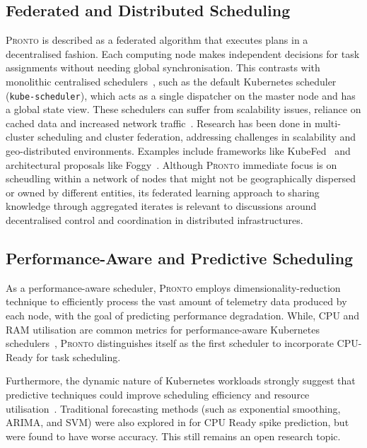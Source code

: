 \subsection{Federated and Distributed Scheduling}
\textsc{Pronto} is described as a federated algorithm that executes plans in a
decentralised fashion. Each computing node makes independent decisions for task
assignments without needing global synchronisation. This contrasts with
monolithic centralised schedulers~\cite{kube-scheduler, gog_firmament_2016},
such as the default Kubernetes scheduler (\texttt{kube-scheduler}), which acts
as a single dispatcher on the master node and has a global state view. These
schedulers can suffer from scalability issues, reliance on cached data and
increased network traffic~\cite{grammenos_pronto_2021}. Research has been done
in multi-cluster scheduling and cluster federation, addressing challenges in
scalability and geo-distributed environments. Examples include frameworks like
KubeFed~\cite{faticanti2021application} and architectural proposals like
Foggy~\cite{santoro2017foggy}. Although \textsc{Pronto} immediate focus is on
scheudling within a network of nodes that might not be geographically dispersed
or owned by different entities, its federated learning approach to sharing
knowledge through aggregated iterates is relevant to discussions around
decentralised control and coordination in distributed infrastructures.

\subsection{Performance-Aware and Predictive Scheduling}
As a performance-aware scheduler, \textsc{Pronto} employs
dimensionality-reduction technique to efficiently process the vast amount of
telemetry data produced by each node, with the goal of predicting performance
degradation. While, CPU and RAM utilisation are common metrics for
performance-aware Kubernetes schedulers~\cite{bao2019deep, beltre2019kubesphere,
bestari2020dynamic, carvalho2021qoe, toka2021ultra}, \textsc{Pronto}
distinguishes itself as the first scheduler to incorporate CPU-Ready for task
scheduling.

Furthermore, the dynamic nature of Kubernetes workloads strongly suggest that
predictive techniques could improve scheduling efficiency and resource
utilisation~\cite{carrion2022kubernetes}. Traditional forecasting methods (such as
exponential smoothing, ARIMA, and SVM) were also explored in
\cite{grammenos_pronto_2021} for CPU Ready spike prediction, but were found to
have worse accuracy. This still remains an open research topic.

